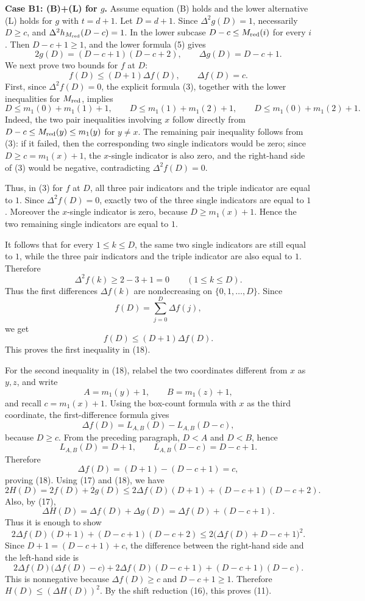 \medskip
\noindent\textbf{Case B1: (B)+(L) for $g$.}
Assume equation (B) holds and the lower alternative (L) holds for $g$ with $t=d+1$. Let $D=d+1$. Since $\Delta^2g(D)=1$, necessarily $D\ge c$, and $\Delta^2h_{M_{\rm red}}(D-c)=1$.
In the lower subcase $D-c\le M_{\rm red}(i)$ for every $i$. Then $D-c+1\ge 1$, and the lower formula (5) gives
\[
  2g(D)=(D-c+1)(D-c+2),
  \qquad
  \Delta g(D)=D-c+1.                                           \tag{17}
\]
We next prove two bounds for $f$ at $D$:
\[
  f(D)\le (D+1)\Delta f(D),
  \qquad
  \Delta f(D)=c.                                       \tag{18}
\]
First, since $\Delta^2f(D)=0$, the explicit formula (3), together with
the lower inequalities for $M_{\rm red}$, implies
\[
  D\le m_1(0)+m_1(1)+1,
  \qquad
  D\le m_1(1)+m_1(2)+1,
  \qquad
  D\le m_1(0)+m_1(2)+1.                                  \tag{19}
\]
Indeed, the two pair inequalities involving $x$ follow directly from
$D-c\le M_{\rm red}(y)\le m_1(y)$ for $y\ne x$.  The remaining pair
inequality follows from (3): if it failed, then the corresponding two
single indicators would be zero; since $D\ge c=m_1(x)+1$, the
$x$-single indicator is also zero, and the right-hand side of (3)
would be negative, contradicting $\Delta^2f(D)=0$.

Thus, in (3) for $f$ at $D$, all three pair indicators and the triple
indicator are equal to $1$.  Since $\Delta^2f(D)=0$, exactly two of
the three single indicators are equal to $1$.  Moreover the
$x$-single indicator is zero, because $D\ge m_1(x)+1$.  Hence the
two remaining single indicators are equal to $1$.

It follows that for every $1\le k\le D$, the same two single
indicators are still equal to $1$, while the three pair indicators and
the triple indicator are also equal to $1$.  Therefore
\[
  \Delta^2f(k)\ge 2-3+1=0
  \qquad(1\le k\le D).
\]
Thus the first differences $\Delta f(k)$ are nondecreasing on
$\{0,1,\ldots,D\}$.  Since
\[
  f(D)=\sum_{j=0}^{D}\Delta f(j),
\]
we get
\[
  f(D)\le (D+1)\Delta f(D).
\]
This proves the first inequality in (18).

For the second inequality in (18), relabel the two coordinates different
from $x$ as $y,z$, and write
\[
  A=m_1(y)+1,
  \qquad
  B=m_1(z)+1,
\]
and recall $c=m_1(x)+1$. Using the box-count formula with $x$ as the third coordinate, the
first-difference formula gives
\[
  \Delta f(D)=L_{A,B}(D)-L_{A,B}(D-c),
\]
because $D\ge c$.  From the preceding paragraph,
$D<A$ and $D<B$, hence
\[
  L_{A,B}(D)=D+1,
  \qquad
  L_{A,B}(D-c)=D-c+1.
\]
Therefore
\[
  \Delta f(D)=(D+1)-(D-c+1)=c,
\]
proving (18). Using (17) and (18), we have
\[
  2H(D)
  =
  2f(D)+2g(D)
  \le
  2\Delta f(D)(D+1)+(D-c+1)(D-c+2).
\]
Also, by (17),
\[
  \Delta H(D)=\Delta f(D)+\Delta g(D)
  =
  \Delta f(D)+(D-c+1).
\]
Thus it is enough to show
\[
  2\Delta f(D)(D+1)+(D-c+1)(D-c+2)
  \le
  2\bigl(\Delta f(D)+D-c+1\bigr)^2.
\]
Since $D+1=(D-c+1)+c$, the difference between the right-hand side and
the left-hand side is
\[
  2\Delta f(D)\bigl(\Delta f(D)-c\bigr)
  +2\Delta f(D)(D-c+1)
  +(D-c+1)(D-c).
\]
This is nonnegative because $\Delta f(D)\ge c$ and $D-c+1\ge1$.
Therefore $H(D)\le(\Delta H(D))^2$.
By the shift reduction (16), this proves (11).

